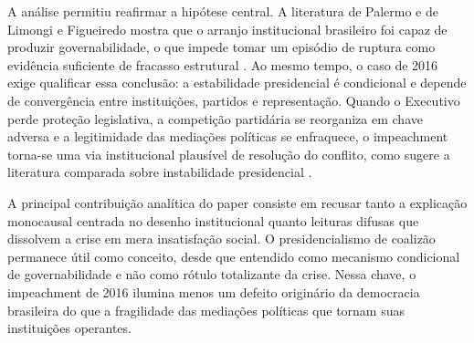 \documentclass[12pt,a4paper]{article}
\begin{document}
A análise permitiu reafirmar a hipótese central. A literatura de Palermo e de Limongi e Figueiredo mostra que o arranjo institucional brasileiro foi capaz de produzir governabilidade, o que impede tomar um episódio de ruptura como evidência suficiente de fracasso estrutural \textcite{palermo2000_como_se} \textcite{limongi2017_a_crise}. Ao mesmo tempo, o caso de 2016 exige qualificar essa conclusão: a estabilidade presidencial é condicional e depende de convergência entre instituições, partidos e representação. Quando o Executivo perde proteção legislativa, a competição partidária se reorganiza em chave adversa e a legitimidade das mediações políticas se enfraquece, o impeachment torna-se uma via institucional plausível de resolução do conflito, como sugere a literatura comparada sobre instabilidade presidencial \textcite{perez_lian2016_explaining_military}.

A principal contribuição analítica do paper consiste em recusar tanto a explicação monocausal centrada no desenho institucional quanto leituras difusas que dissolvem a crise em mera insatisfação social. O presidencialismo de coalizão permanece útil como conceito, desde que entendido como mecanismo condicional de governabilidade e não como rótulo totalizante da crise. Nessa chave, o impeachment de 2016 ilumina menos um defeito originário da democracia brasileira do que a fragilidade das mediações políticas que tornam suas instituições operantes.

\printbibliography
\end{document}
